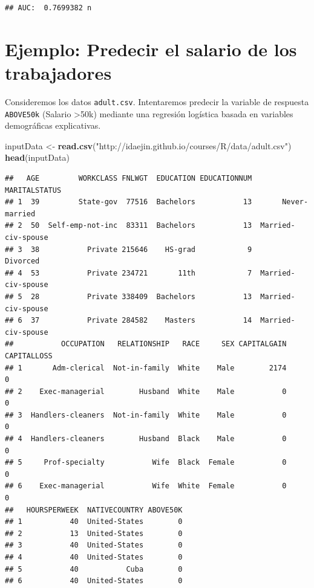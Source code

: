 \documentclass[]{book}
\newenvironment{Shaded}{\begin{snugshade}}{\end{snugshade}}
\newcommand{\KeywordTok}[1]{\textcolor[rgb]{0.13,0.29,0.53}{\textbf{#1}}}
\newcommand{\StringTok}[1]{\textcolor[rgb]{0.31,0.60,0.02}{#1}}
\newcommand{\NormalTok}[1]{#1}
\begin{document}
\begin{verbatim}
## AUC:  0.7699382 n
\end{verbatim}

\section{Ejemplo: Predecir el salario de los
trabajadores}\label{ejemplo-predecir-el-salario-de-los-trabajadores}

Consideremos los datos \texttt{adult.csv}. Intentaremos predecir la
variable de respuesta \texttt{ABOVE50k} (Salario \textgreater{}50k)
mediante una regresión logística basada en variables demográficas
explicativas.

\begin{Shaded}
\begin{Highlighting}[]
\NormalTok{inputData <-}\StringTok{ }\KeywordTok{read.csv}\NormalTok{(}\StringTok{"http://idaejin.github.io/courses/R/data/adult.csv"}\NormalTok{)}
\KeywordTok{head}\NormalTok{(inputData)}
\end{Highlighting}
\end{Shaded}

\begin{verbatim}
##   AGE         WORKCLASS FNLWGT  EDUCATION EDUCATIONNUM       MARITALSTATUS
## 1  39         State-gov  77516  Bachelors           13       Never-married
## 2  50  Self-emp-not-inc  83311  Bachelors           13  Married-civ-spouse
## 3  38           Private 215646    HS-grad            9            Divorced
## 4  53           Private 234721       11th            7  Married-civ-spouse
## 5  28           Private 338409  Bachelors           13  Married-civ-spouse
## 6  37           Private 284582    Masters           14  Married-civ-spouse
##           OCCUPATION   RELATIONSHIP   RACE     SEX CAPITALGAIN CAPITALLOSS
## 1       Adm-clerical  Not-in-family  White    Male        2174           0
## 2    Exec-managerial        Husband  White    Male           0           0
## 3  Handlers-cleaners  Not-in-family  White    Male           0           0
## 4  Handlers-cleaners        Husband  Black    Male           0           0
## 5     Prof-specialty           Wife  Black  Female           0           0
## 6    Exec-managerial           Wife  White  Female           0           0
##   HOURSPERWEEK  NATIVECOUNTRY ABOVE50K
## 1           40  United-States        0
## 2           13  United-States        0
## 3           40  United-States        0
## 4           40  United-States        0
## 5           40           Cuba        0
## 6           40  United-States        0
\end{verbatim}
\end{document}
